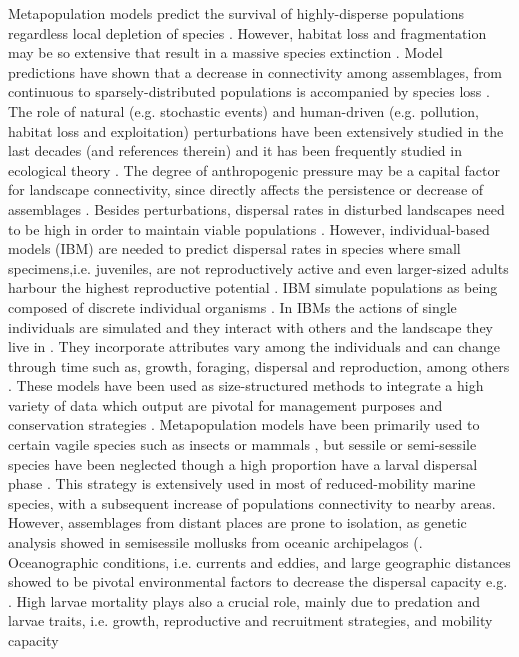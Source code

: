\documentclass[12pt]{article}
\begin{document}
\begin{justify}
{{{{{Metapopulation models predict the survival of highly-disperse populations regardless local depletion of species \citep{hanski1999habitat,akccakaya2007role}. However, habitat loss and fragmentation may be so extensive that result in a massive species extinction \citep{montoya2008habitat,Rybicki and Hanksi,
2013,haddad2015habitat}. Model predictions have shown that a decrease in connectivity among assemblages, from continuous to sparsely-distributed populations is accompanied by species loss \citep{metzger2009time, niebuhr2015survival}. The role of natural (e.g. stochastic events) and human-driven (e.g. pollution, habitat loss and exploitation) perturbations have been extensively studied in the last decades (\citep{dornelas2010disturbance}and references therein) and it has been frequently studied in ecological theory \citep{volkov2007pattern, gardner2008spatial}. The degree of anthropogenic pressure may be a capital factor for landscape connectivity, since directly affects the persistence or decrease of assemblages \citep{supp2014species}. Besides perturbations, dispersal rates in disturbed landscapes need to be high in order to maintain viable populations \citep{provan2008high}. However, individual-based models (IBM) are needed to predict dispersal rates in species where small specimens,i.e. juveniles, are not reproductively active and even larger-sized adults harbour the highest reproductive potential \citep{hendriks2008scaling,  werner2011reproductive}. IBM simulate populations as being composed of discrete individual organisms \citep{deangelis2014individual, an2016predicting}. In IBMs the actions of single individuals are simulated and they interact with others and the landscape they live in \citep{deangelis2005individual}. They incorporate attributes vary among the individuals and can change through time such as, growth, foraging, dispersal and reproduction, among others \citep{martin2013predicting, deangelis2014individual}. These models have been used as size-structured methods to integrate a high variety of data which output are pivotal for management purposes \citep{punt2013review} and conservation strategies \citep{nabe2014effects}. Metapopulation models have been primarily used to certain vagile species such as insects \citep{harrison1995testing, hilker2006parameterizing}or mammals \citep{krohne1997dynamics, lawes2000patch}, but sessile or semi-sessile species have been neglected though a high proportion have a larval dispersal phase \citep{sale2006merging, gaggiotti2017metapopulations}. This strategy is extensively used in most of reduced-mobility marine species, with a subsequent increase of populations connectivity to nearby areas. However, assemblages from distant places are prone to isolation, as genetic analysis showed in semisessile mollusks from oceanic archipelagos (\citep{corte1996population, gaggiotti2017metapopulations, faria2017disentangling}. Oceanographic conditions, i.e. currents and eddies, and large geographic distances showed to be pivotal environmental factors to decrease the dispersal capacity e.g. \citep{palumbi1994genetic}. High larvae mortality plays also a crucial role, mainly due to predation and larvae traits, i.e. growth, reproductive and recruitment strategies, and mobility capacity \citep{cowen2000connectivity, }}}}}}
\end{justify}
\end{document}
